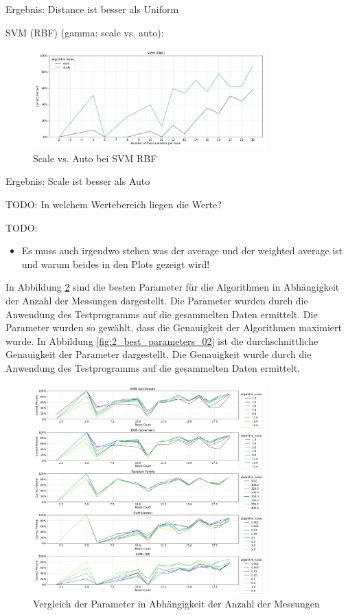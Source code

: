 Ergebnis: Distance ist besser als Uniform

SVM (RBF) (gamma: scale vs. auto):

\begin{figure}[H]
    \centering
    \includegraphics[width=0.8\textwidth]{images/1_best_parameters_svm_01.png}
    \caption{Scale vs. Auto bei SVM RBF}
    \label{fig:1_best_parameters_svm_01}
\end{figure}

Ergebnis: Scale ist besser als Auto

TODO: In welchem Wertebereich liegen die Werte?

TODO:
\begin{itemize}
    \item Es muss auch irgendwo stehen was der average und der weighted average ist und warum beides in den Plots gezeigt wird!
\end{itemize}

In Abbildung \ref{fig:2_best_parameters_01} sind die besten Parameter für die Algorithmen in Abhängigkeit der Anzahl der Messungen dargestellt. Die Parameter wurden durch die Anwendung des Testprogramms auf die gesammelten Daten ermittelt. Die Parameter wurden so gewählt, dass die Genauigkeit der Algorithmen maximiert wurde. In Abbildung \ref{fig:2_best_parameters_02} ist die durchschnittliche Genauigkeit der Parameter dargestellt. Die Genauigkeit wurde durch die Anwendung des Testprogramms auf die gesammelten Daten ermittelt.

\begin{figure}[H]
    \centering
    \includegraphics[width=0.8\textwidth]{images/2_best_parameters_01.png}
    \caption{Vergleich der Parameter in Abhängigkeit der Anzahl der Messungen}
    \label{fig:2_best_parameters_01}
\end{figure}

